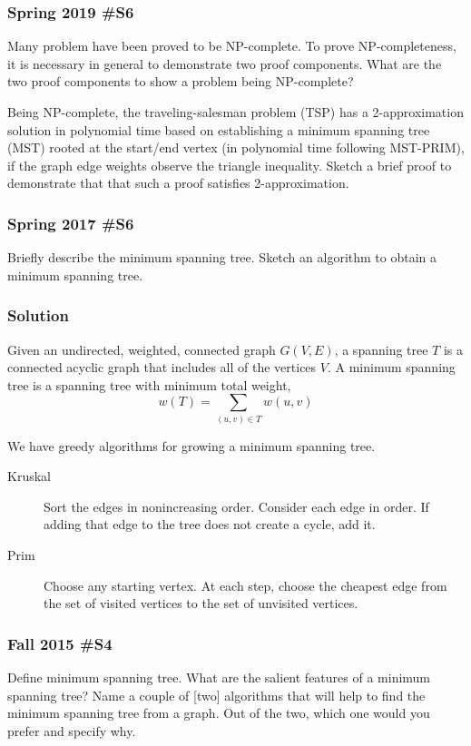 \subsubsection{Spring 2019 \#S6}
Many problem have been proved to be NP-complete.  To prove NP-completeness, it is necessary in general to demonstrate two proof components.  What are the two proof components to show a problem being NP-complete?
	
	Being NP-complete, the traveling-salesman problem (TSP) has a 2-approximation solution in polynomial time based on establishing a minimum spanning tree (MST) rooted at the start/end vertex (in polynomial time following MST-PRIM), if the graph edge weights observe the triangle inequality.  Sketch a brief proof to demonstrate that that such a proof satisfies 2-approximation.  

\subsubsection{Spring 2017 \#S6}
Briefly describe the minimum spanning tree.  Sketch an algorithm to obtain a minimum spanning tree.

\subsubsection{Solution}

Given an undirected, weighted, connected graph $G(V,E)$, a spanning tree $T$ is a connected acyclic graph that includes all of the vertices $V$.  A minimum spanning tree is a spanning tree with minimum total weight, $$w(T) = \sum_{(u,v) \in T} w(u,v)$$

We have greedy algorithms for growing a minimum spanning tree.  

\begin{description}
	\item [Kruskal]  Sort the edges in nonincreasing order.  Consider each edge in order.  If adding that edge to the tree does not create a cycle, add it.  
	\item [Prim] Choose any starting vertex.  At each step, choose the cheapest edge from the set of visited vertices to the set of unvisited vertices.  	
\end{description}

\subsubsection{Fall 2015 \#S4}
Define minimum spanning tree.  What are the salient features of a minimum spanning tree?  Name a couple of [two] algorithms that will help to find the minimum spanning tree from a graph.  Out of the two, which one would you prefer and specify why.  

